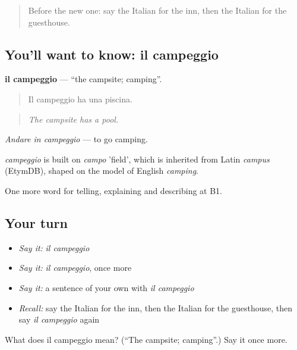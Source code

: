 \label{lesson:IT-C429-campeggio}



\begin{quote}
Before the new one: say the Italian for the inn, then the Italian for the guesthouse.
\end{quote}

\subsection*{You'll want to know: il campeggio}
\textbf{il campeggio} — \textquotedblleft{}the campsite; camping\textquotedblright{}.

\begin{quote}
Il campeggio ha una piscina.
\end{quote}

\begin{quote}
\emph{The campsite has a pool.}
\end{quote}

\emph{Andare in campeggio} — to go camping.

\begin{cousinweb}
\emph{campeggio} is built on \emph{campo} 'field', which is inherited from Latin \emph{campus} (EtymDB), shaped on the model of English \emph{camping}.
\end{cousinweb}

\begin{grammarlens}[title={What you've built}]
One more word for telling, explaining and describing at B1.
\end{grammarlens}

\subsection*{Your turn}
\begin{itemize}
\raggedright
  \item \emph{Say it:} \emph{il campeggio}
  \item \emph{Say it:} \emph{il campeggio}, once more
  \item \emph{Say it:} a sentence of your own with \emph{il campeggio}
  \item \emph{Recall:} say the Italian for the inn, then the Italian for the guesthouse, then say \emph{il campeggio} again
\end{itemize}

\begin{tcolorbox}[breakable,colback=teal!4,colframe=teal!35!black,title={Before you move on}]
What does il campeggio mean? (\textquotedblleft{}The campsite; camping\textquotedblright{}.) Say it once more.
\end{tcolorbox}
